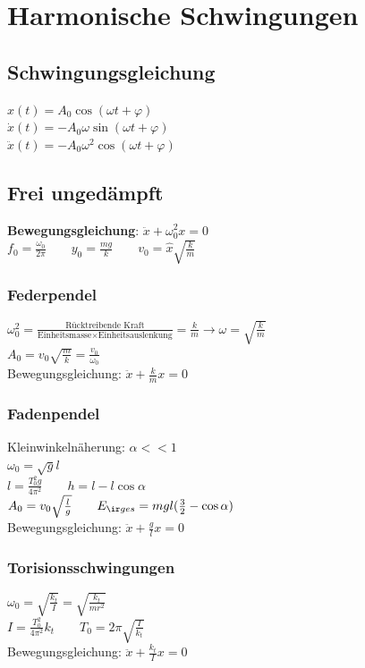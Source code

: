 \documentclass[german]{latex4ei/latex4ei_sheet}
\begin{document}
\section{Harmonische Schwingungen}
\begin{sectionbox}
\subsection{Schwingungsgleichung}
$x(t)=A_0\cos(\omega t + \varphi)$ \\
$\dot{x}(t)=-A_0\omega\sin(\omega t + \varphi)$\\
$\ddot{x}(t)=-A_0\omega^2\cos(\omega t + \varphi)$
\end{sectionbox}

\begin{sectionbox}
\subsection{Frei ungedämpft}
\textbf{Bewegungsgleichung}: $\ddot{x}+\omega_0^2x=0$\\
$f_0=\frac{\omega_0}{2\pi} \qquad y_0=\frac{mg}{k} \qquad v_0 = \hat{x}\sqrt{\frac{k}{m}}$
\subsubsection{Federpendel}
$\omega_0^2=\frac{\text{Rücktreibende Kraft}}{\text{Einheitsmasse} \times \text{Einheitsauslenkung}}=\frac{k}{m} \rightarrow \omega = \sqrt{\frac{k}{m}}$\\
$A_0=v_0\sqrt{\frac{m}{k}}=\frac{v_0}{\omega_0}$\\
Bewegungsgleichung: $\ddot{x}+\frac{k}{m}x=0$
\subsubsection{Fadenpendel}
Kleinwinkelnäherung: $\alpha << 1$\\
$\omega_0=\sqrt{g}{l}$\\
$l=\frac{T_0^2g}{4\pi^2} \qquad h=l-l\cos \alpha$\\
$A_0 = v_0 \sqrt{\frac{l}{g}} \qquad E_{\ir ges} = mgl(\frac{3}{2}-\cos \alpha)$\\
Bewegungsgleichung: $\ddot{x}+\frac{g}{l}x=0$
\subsubsection{Torisionsschwingungen}
$\omega_0 = \sqrt{\frac{k_t}{I}}=\sqrt{\frac{k_t}{mr^2}}$\\
$I=\frac{T_0^2}{4\pi^2}k_t \qquad T_0=2\pi \sqrt{\frac{I}{k_t}}$\\
Bewegungsgleichung: $\ddot{x}+\frac{k_t}{I}x=0$
\end{sectionbox}
\end{document}
